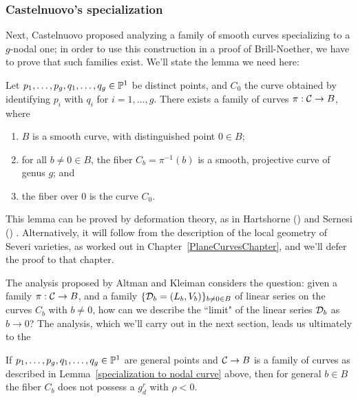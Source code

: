 \subsubsection{Castelnuovo's specialization}

Next, Castelnuovo proposed analyzing a family of smooth curves specializing to a $g$-nodal one; in order to use this construction in a proof of Brill-Noether, we have to prove that such families exist. We'll state the lemma we need here:

\begin{lemma}\label{specialization to nodal curve}
Let $p_1,\dots,p_g, q_1,\dots, q_g \in \PP^1$ be distinct points, and $C_0$ the curve obtained by identifying $p_i$ with $q_i$ for $i = 1,\dots,g$. There exists a family of curves $\pi : \cC \to B$, where
\begin{enumerate}
\item $B$ is a smooth curve, with distinguished point $0 \in B$;
\item for all $b \neq 0 \in B$, the fiber $C_b = \pi^{-1}(b)$ is a smooth, projective curve of genus $g$;  and
\item the fiber over $0$ is the curve $C_0$.
\end{enumerate}
\end{lemma}

This lemma can be proved by deformation theory, as in Hartshorne (\cite{}) and Sernesi (\cite{}) . Alternatively, it will follow from the description of the local geometry of Severi varieties, as worked out in Chapter~\ref{PlaneCurvesChapter}, and we'll defer the proof to that chapter.

The analysis proposed by Altman and Kleiman considers the question: given a family $\pi : \cC \to B$, and a family $\{ \cD_b = (L_b, V_b)\}_{b \neq 0 \in B}$ of linear series on the curves $C_b$ with $b \neq 0$, how can we describe the ``limit" of the linear series $\cD_b$ as $b \to 0$? The analysis, which we'll carry out in the next section, leads us ultimately to the  


\begin{lemma}\label{BN in family}
If $p_1,\dots,p_g, q_1,\dots, q_g \in \PP^1$ are general points and $\cC \to B$ is a family of curves as described in Lemma~\ref{specialization to nodal curve} above, then for general $b \in B$ the fiber $C_b$ does not possess a $g^r_d$ with $\rho < 0$.
\end{lemma}

